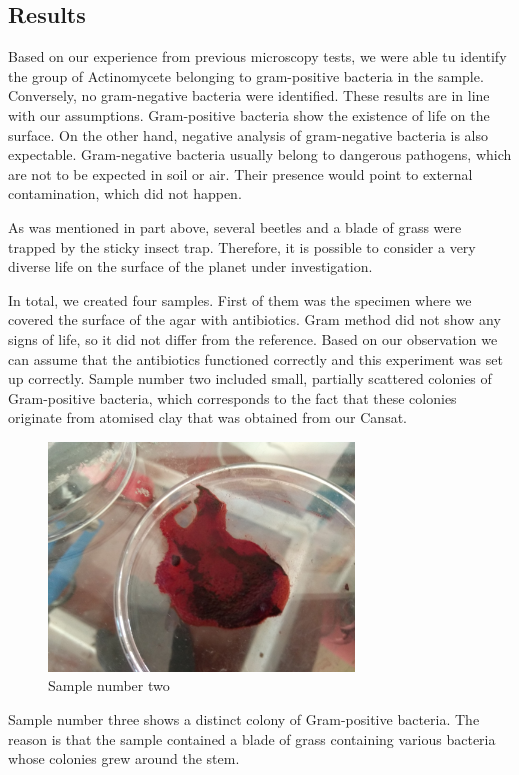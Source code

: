 \documentclass{cfp}
\begin{document}
\subsection{Results}
\par
Based on our experience from previous microscopy tests, we were able tu identify the group of Actinomycete belonging to gram-positive bacteria in the sample. Conversely, no gram-negative bacteria were identified. These results are in line with our assumptions. Gram-positive bacteria show the existence of life on the surface. On the other hand, negative analysis of gram-negative bacteria is also expectable. Gram-negative bacteria usually belong to dangerous pathogens, which are not to be expected in soil or air. Their presence would point to external contamination, which did not happen.
\par
As was mentioned in part above, several beetles and a blade of grass were trapped by the sticky insect trap. Therefore, it is possible to consider a very diverse life on the surface of the planet under investigation.
\par
In total, we created four samples. First of them was the specimen where we covered the surface of the agar with antibiotics. Gram method did not show any signs of life, so it did not differ from the reference. Based on our observation we can assume that the antibiotics functioned correctly and this experiment was set up correctly. Sample number two included small, partially scattered colonies of Gram-positive bacteria, which corresponds to the fact that these colonies originate from atomised clay that was obtained from our Cansat.
\begin{figure}[!h]
\centering
\caption{Sample number two}
\includegraphics[width=230pt]{Sample-soil.jpg}
\end{figure}
\par
Sample number three shows a distinct colony of Gram-positive bacteria. The reason is that the sample contained a blade of grass containing various bacteria whose colonies grew around the stem.
\end{document}
